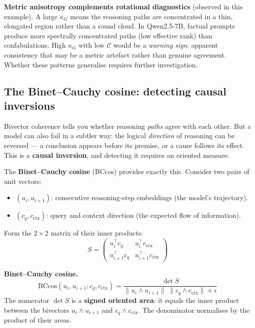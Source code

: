 \documentclass[11pt, twoside, openright]{memoir}
\newcommand{\op}{\wedge}          %
\numberwithin{equation}{chapter}
\begin{document}
\begin{finding}
\textbf{Metric anisotropy complements rotational diagnostics}
(observed in this example).
A large $\kappa_G$ means the reasoning paths are concentrated in a
thin, elongated region rather than a round cloud.  In Qwen2.5-7B,
factual prompts produce more spectrally concentrated paths (low
effective rank) than confabulations.  High $\kappa_G$ with low
$\mathcal{C}$ would be a \emph{warning sign}: apparent consistency
that may be a metric artefact rather than genuine agreement.  Whether
these patterns generalise requires further investigation.
\end{finding}

\subsection{The Binet--Cauchy cosine: detecting causal inversions}

Bivector coherence tells you whether reasoning \emph{paths} agree with
each other.  But a model can also fail in a subtler way: the logical
\emph{direction} of reasoning can be reversed --- a conclusion appears
before its premise, or a cause follows its effect.  This is a
\textbf{causal inversion}, and detecting it requires an oriented
measure.

The \textbf{Binet--Cauchy cosine} (BCcos) provides exactly this.
Consider two pairs of unit vectors:
\begin{itemize}[nosep]
\item $(u_i, u_{i+1})$: consecutive reasoning-step embeddings
  (the model's trajectory).
\item $(c_q, c_{\text{ctx}})$: query and context direction
  (the expected flow of information).
\end{itemize}

Form the $2 \times 2$ matrix of their inner products:
\begin{equation}
  S = \begin{pmatrix}
    u_i^\top c_q & u_i^\top c_{\text{ctx}} \\
    u_{i+1}^\top c_q & u_{i+1}^\top c_{\text{ctx}}
  \end{pmatrix}
\end{equation}

\begin{gabox}
\textbf{Binet--Cauchy cosine.}
\begin{equation}
  \text{BCcos}(u_i, u_{i+1}; c_q, c_{\text{ctx}})
  = \frac{\det S}{\|u_i \op u_{i+1}\| \; \|c_q \op c_{\text{ctx}}\|
    + \epsilon}
\end{equation}
The numerator $\det S$ is a \textbf{signed oriented area}: it equals
the inner product between the bivectors $u_i \op u_{i+1}$ and
$c_q \op c_{\text{ctx}}$.  The denominator normalises by the product
of their areas.
\end{gabox}
\end{document}
